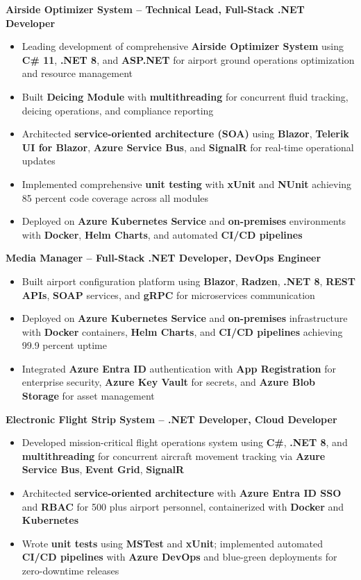 \documentclass[10pt,a4paper]{article}
\begin{document}
\textbf{Airside Optimizer System -- Technical Lead, Full-Stack .NET Developer}
\begin{itemize}
    \item Leading development of comprehensive \textbf{Airside Optimizer System} using \textbf{C\# 11}, \textbf{.NET 8}, and \textbf{ASP.NET} for airport ground operations optimization and resource management
    \item Built \textbf{Deicing Module} with \textbf{multithreading} for concurrent fluid tracking, deicing operations, and compliance reporting
    \item Architected \textbf{service-oriented architecture (SOA)} using \textbf{Blazor}, \textbf{Telerik UI for Blazor}, \textbf{Azure Service Bus}, and \textbf{SignalR} for real-time operational updates
    \item Implemented comprehensive \textbf{unit testing} with \textbf{xUnit} and \textbf{NUnit} achieving 85 percent code coverage across all modules
    \item Deployed on \textbf{Azure Kubernetes Service} and \textbf{on-premises} environments with \textbf{Docker}, \textbf{Helm Charts}, and automated \textbf{CI/CD pipelines}
\end{itemize}

\textbf{Media Manager -- Full-Stack .NET Developer, DevOps Engineer}
\begin{itemize}
    \item Built airport configuration platform using \textbf{Blazor}, \textbf{Radzen}, \textbf{.NET 8}, \textbf{REST APIs}, \textbf{SOAP} services, and \textbf{gRPC} for microservices communication
    \item Deployed on \textbf{Azure Kubernetes Service} and \textbf{on-premises} infrastructure with \textbf{Docker} containers, \textbf{Helm Charts}, and \textbf{CI/CD pipelines} achieving 99.9 percent uptime
    \item Integrated \textbf{Azure Entra ID} authentication with \textbf{App Registration} for enterprise security, \textbf{Azure Key Vault} for secrets, and \textbf{Azure Blob Storage} for asset management
\end{itemize}

\textbf{Electronic Flight Strip System -- .NET Developer, Cloud Developer}
\begin{itemize}
    \item Developed mission-critical flight operations system using \textbf{C\#}, \textbf{.NET 8}, and \textbf{multithreading} for concurrent aircraft movement tracking via \textbf{Azure Service Bus}, \textbf{Event Grid}, \textbf{SignalR}
    \item Architected \textbf{service-oriented architecture} with \textbf{Azure Entra ID SSO} and \textbf{RBAC} for 500 plus airport personnel, containerized with \textbf{Docker} and \textbf{Kubernetes}
    \item Wrote \textbf{unit tests} using \textbf{MSTest} and \textbf{xUnit}; implemented automated \textbf{CI/CD pipelines} with \textbf{Azure DevOps} and blue-green deployments for zero-downtime releases
\end{itemize}
\end{document}
